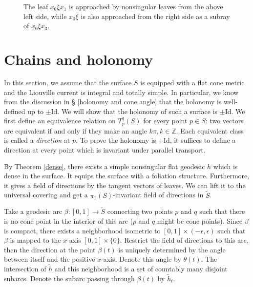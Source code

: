 \documentclass[reqno]{amsart}
\theoremstyle{plain}
\theoremstyle{definition}
\theoremstyle{remark}
\theoremstyle{definition}
\newcommand{\Z}{\mathbb Z}
\newcommand{\?}{\textcolor{red}{?}}
\begin{document}
\begin{figure}[h]
    \centering
    \captionsetup{width=0.8\textwidth}
    \caption{The leaf $x_0\xi x_1$ is approached by nonsingular leaves from the above left side, while $x_0\xi$ is also approached from the right side as a subray of $x_0\xi x_3$.}
    \label{sides}
\end{figure}



\section{Chains and holonomy}

In this section, we assume that the surface $S$ is equipped with a flat cone metric and the Liouville current is integral and totally simple. In particular, we know from the discussion in § \ref{holonomy and cone angle} that the holonomy is well-defined up to $\pm\mathrm{Id}$. We will show that the holonomy of such a surface is $\pm\mathrm{Id}$. We first define an equivalence relation on $T^1_p(S)$ for every point $p\in S$: two vectors are equivalent if and only if they make an angle $k\pi,k\in\Z$. Each equivalent class is called a \textit{direction} at $p$. To prove the holonomy is $\pm \mathrm{Id}$, it suffices to define a direction at every point which is invariant under parallel transport.

By Theorem \ref{dense}, there exists a simple nonsingular flat geodesic $h$ which is dense in the surface. It equips the surface with a foliation structure. Furthermore, it gives a field of directions by the tangent vectors of leaves. We can lift it to the universal covering and get a $\pi_1(S)$-invariant field of directions in $\tilde{S}$.

Take a geodesic arc $\beta:[0,1]\to \tilde{S}$ connecting two points $p$ and $q$ such that there is no cone point in the interior of this arc ($p$ and $q$ might be cone points). Since $\beta$ is compact, there exists a neighborhood isometric to $[0,1]\times (-\epsilon,\epsilon)$ such that $\beta$ is mapped to the $x$-axis $[0,1]\times \{0\}$. Restrict the field of directions to this arc, then the direction at the point $\beta(t)$ is uniquely determined by the angle between itself and the positive $x$-axis. Denote this angle by $\theta(t)$. The intersection of $\tilde{h}$ and this neighborhood is a set of countably many disjoint subarcs. Denote the subarc passing through $\beta(t)$ by $\tilde{h}_t$.
\end{document}
